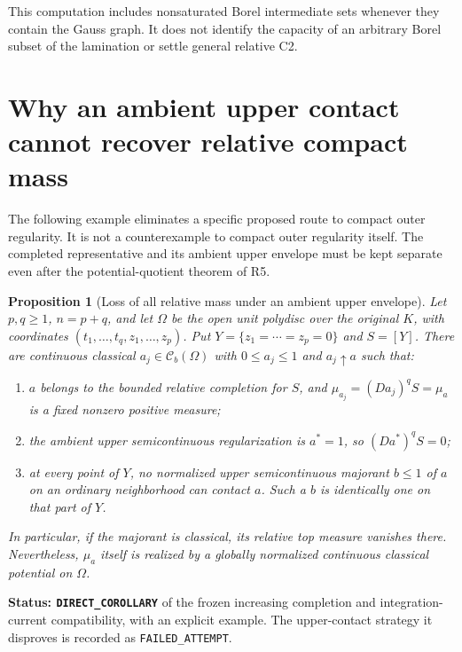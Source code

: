 \documentclass[11pt,a4paper]{article}
\numberwithin{equation}{section}
\newtheorem{proposition}[theorem]{Proposition}
\theoremstyle{definition}
\theoremstyle{remark}
\begin{document}
This computation includes nonsaturated Borel intermediate sets whenever
they contain the Gauss graph. It does not identify the capacity of an
arbitrary Borel subset of the lamination or settle general relative C2.



\section{Why an ambient upper contact cannot recover relative compact mass}
\label{sec:r6-capacity-upper-envelope-obstruction}

The following example eliminates a specific proposed route to compact
outer regularity. It is not a counterexample to compact outer regularity
itself. The completed representative and its ambient upper envelope must
be kept separate even after the potential-quotient theorem of R5.

\begin{proposition}[Loss of all relative mass under an ambient upper envelope]
\label{prop:r6-upper-envelope-relative-mass-loss}
Let $p,q\geq1$, $n=p+q$, and let $\Omega$ be the open unit polydisc
over the original $K$, with coordinates $(t_1,\ldots,t_q,z_1,\ldots,z_p)$.
Put $Y=\{z_1=\cdots=z_p=0\}$ and $S=[Y]$.
There are continuous classical $a_j\in\mathcal C_b(\Omega)$ with
$0\leq a_j\leq1$ and $a_j\uparrow a$ such that:
\begin{enumerate}
\item $a$ belongs to the bounded relative completion for $S$, and
      $\mu_{a_j}=(Da_j)^qS=\mu_a$ is a fixed nonzero positive measure;
\item the ambient upper semicontinuous regularization is $a^*=1$,
      so $(Da^*)^qS=0$;
\item at every point of $Y$, no normalized upper semicontinuous
      majorant $b\leq1$ of $a$ on an ordinary neighborhood can contact
      $a$. Such a $b$ is identically one on that part of $Y$.
\end{enumerate}
In particular, if the majorant is classical, its relative top measure
vanishes there. Nevertheless, $\mu_a$ itself is realized by a globally
normalized continuous classical potential on $\Omega$.
\end{proposition}

\noindent\textbf{Status: \texttt{DIRECT\_COROLLARY}} of the frozen
increasing completion and integration-current compatibility, with an
explicit example. The upper-contact strategy it disproves is recorded
as \texttt{FAILED\_ATTEMPT}.
\end{document}
